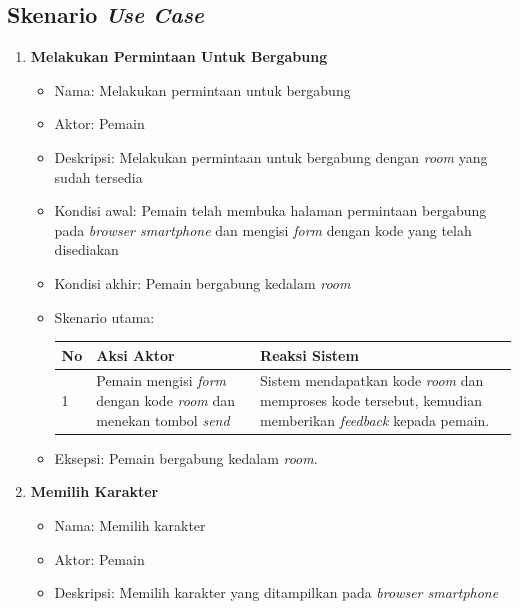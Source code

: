 \subsection{Skenario \textit{Use Case}}

\begin{enumerate}
	\item \textbf{Melakukan Permintaan Untuk Bergabung}
	
	\begin{itemize}
		\item Nama: Melakukan permintaan untuk bergabung
		
		\item Aktor: Pemain
		
		\item Deskripsi: Melakukan permintaan untuk bergabung dengan \textit{room} yang sudah tersedia
		
		\item Kondisi awal: Pemain telah membuka halaman permintaan bergabung pada \textit{browser smartphone} dan mengisi \textit{form} dengan kode yang telah disediakan
		
		\item Kondisi akhir: Pemain bergabung kedalam \textit{room}
		
		\item Skenario utama: 
		

\begin{tabular}{ |p{1cm}|p{4cm}|p{4cm}|}
	\hline
	No & Aksi Aktor & Reaksi Sistem \\ \hline
	1 & Pemain mengisi \textit{form} dengan kode \textit{room} dan menekan tombol \textit{send} & Sistem mendapatkan kode \textit{room} dan memproses kode tersebut, kemudian memberikan \textit{feedback} kepada pemain. \\ \hline
\end{tabular}

		\item Eksepsi: Pemain bergabung kedalam \textit{room}.

		
	\end{itemize}
	
	\item \textbf{Memilih Karakter}
	
	\begin{itemize}
		\item Nama: Memilih karakter
		
		\item Aktor: Pemain
		
		\item Deskripsi: Memilih karakter yang ditampilkan pada \textit{browser smartphone}
		

\end{itemize}
\end{enumerate}
